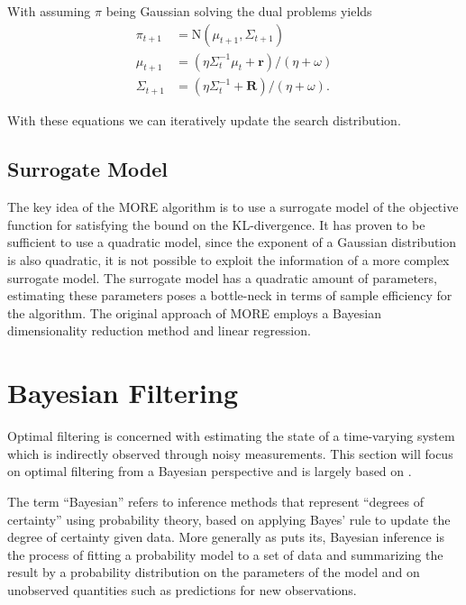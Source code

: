 
With assuming $\pi$ being Gaussian solving the dual problems yields
\begin{equation}
  \label{policy_update}
  \begin{aligned}
    \pi_{t+1} &= \text{N}(\mu_{t+1}, \Sigma_{t+1}) \\
    \mu_{t+1} &= (\eta \Sigma_{t}^{-1}\mu_t + \mathbf{r}) / (\eta + \omega) \\
    \Sigma_{t+1} &= (\eta \Sigma_t^{-1} + \mathbf{R}) / (\eta + \omega).
  \end{aligned}
\end{equation}

With these equations we can iteratively update the search distribution.

\subsection{Surrogate Model}
The key idea of the MORE algorithm is to use a surrogate model
of the objective function
for satisfying the bound on the KL-divergence. It has proven to be
sufficient to use a quadratic model, since the exponent
of a Gaussian distribution
is also quadratic, it is not possible to exploit the information of a more
complex surrogate model.
The surrogate model has a quadratic amount of parameters,
estimating these parameters poses a
bottle-neck in terms of sample efficiency for the algorithm.
The original approach of MORE employs a Bayesian dimensionality
reduction method and linear regression.


\section{Bayesian Filtering}
Optimal filtering is concerned with estimating the state
of a time-varying system
which is indirectly observed through noisy measurements.
This section will focus on optimal filtering from a Bayesian perspective
and is largely based on \citet{sarkka2013bayesian}.

The term ``Bayesian'' refers to inference methods that represent
``degrees of certainty'' using probability theory, based on applying
Bayes' rule to update the degree of certainty given data.
More generally as \citet{gelman2013bayesian} puts its, Bayesian inference
is the process of fitting a probability model
to a set of data and summarizing the result by a probability distribution
on the parameters of the model and on unobserved quantities such
as predictions for new observations.

